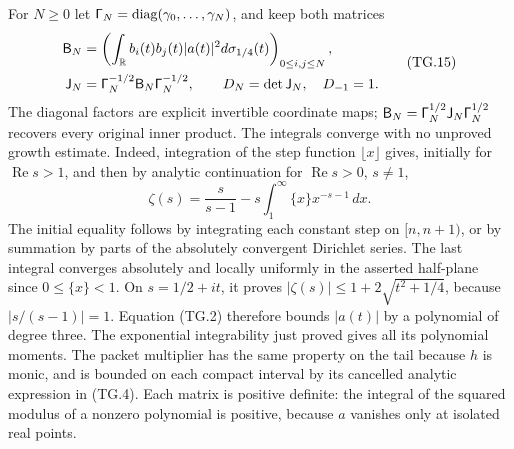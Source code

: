 \documentclass[11pt,a4paper]{article}
\begin{document}
For \(N\geq0\) let \(\mathord{\text{\fontencoding{OT1}\fontfamily{cmss}\selectfont\char0}}_N=\operatorname{diag}
(\gamma_0,\ldots,\gamma_N)\), and keep both matrices
\[
 \begin{aligned}
 \mathsf B_N&=\left(\int_{\mathbb R}
              b_i(t)b_j(t)|a(t)|^2d\sigma_{1/4}(t)\right)_{0\leq i,j\leq N},\\
 \mathsf J_N&=\mathord{\text{\fontencoding{OT1}\fontfamily{cmss}\selectfont\char0}}_N^{-1/2}\mathsf B_N
                       \mathord{\text{\fontencoding{OT1}\fontfamily{cmss}\selectfont\char0}}_N^{-1/2},\qquad
 D_N=\det\mathsf J_N,\quad D_{-1}=1.
 \end{aligned}                                                    \tag{TG.15}
\]
The diagonal factors are explicit invertible coordinate maps;
\(\mathsf B_N=\mathord{\text{\fontencoding{OT1}\fontfamily{cmss}\selectfont\char0}}_N^{1/2}\mathsf J_N
\mathord{\text{\fontencoding{OT1}\fontfamily{cmss}\selectfont\char0}}_N^{1/2}\) recovers every original inner product.
The integrals converge with no unproved growth estimate.  Indeed,
integration of the step function \(\lfloor x\rfloor\) gives,
initially for \(\operatorname{Re}s>1\), and then by analytic
continuation for \(\operatorname{Re}s>0\), \(s\ne1\),
\[
 \zeta(s)=\frac{s}{s-1}
         -s\int_1^\infty\{x\}x^{-s-1}\,dx.
\]
The initial equality follows by integrating each constant step on
\([n,n+1)\), or by summation by parts of the absolutely convergent
Dirichlet series.  The last integral converges absolutely and
locally uniformly in the asserted half-plane since \(0\leq\{x\}<1\).
On \(s=1/2+it\), it proves
\( |\zeta(s)|\leq1+2\sqrt{t^2+1/4}\), because
\(|s/(s-1)|=1\).  Equation (TG.2) therefore bounds \(|a(t)|\)
by a polynomial of degree three.  The exponential integrability
just proved gives all its polynomial moments.  The packet
multiplier has the same property on the tail because \(h\) is
monic, and is bounded on each compact interval by its cancelled
analytic expression in (TG.4).
Each matrix is positive definite:
the integral of the squared modulus of a nonzero polynomial is
positive, because \(a\) vanishes only at isolated real points.
\end{document}
